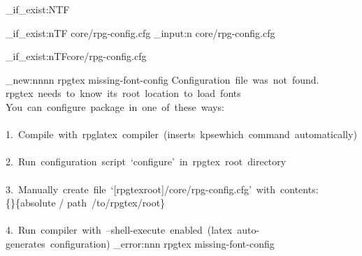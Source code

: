 \ExplSyntaxOn

\cs_if_exist:NTF\RpgPackagePath
{	%
}
{	%
	 
	 
	\file_if_exist:nTF { core/rpg-config.cfg }
	{	%
		\file_input:n { core/rpg-config.cfg }
	}
	{	%
		 
		 
		\immediate{}
		 
		\file_if_exist:nTF{core/rpg-config.cfg}
		{
			
		}
		{
			\msg_new:nnnn { rpgtex } { missing-font-config }
			{
				Configuration~file~was~not~found.
				\\
				rpgtex~needs~to~know~its~root~location~to~load~fonts
				\\
				You~can~configure~package~in~one~of~these~ways:
				\\\\
				1.~Compile~with~rpglatex~compiler~(inserts~kpsewhich~command~automatically)
				\\\\
				2.~Run~configuration~script~`configure'~in~rpgtex~root~directory
				\\\\
				3.~Manually~create~file~`[rpgtexroot]/core/rpg-config.cfg'~with~contents:\\
				\unexpanded{\edef}\{\unexpanded{\RpgPackagePath}\}\{absolute / path~/to/rpgtex/root\}
				\\\\
				4.~Run~compiler~with~--shell-execute~enabled~(latex~auto-generates~configuration)
				}{}
			\msg_error:nnn { rpgtex } { missing-font-config } {  }
		}
	}
}
\ExplSyntaxOff

